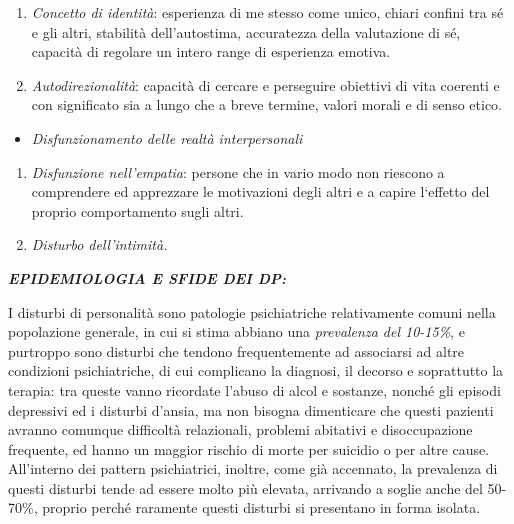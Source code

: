 \documentclass[]{article}
\begin{document}
\begin{enumerate}
\def\labelenumi{\arabic{enumi}.}
\item
  \emph{Concetto di identità}: esperienza di me stesso come unico,
  chiari confini tra sé e gli altri, stabilità dell'autostima,
  accuratezza della valutazione di sé, capacità di regolare un intero
  range di esperienza emotiva.
\item
  \emph{Autodirezionalità}: capacità di cercare e perseguire obiettivi
  di vita coerenti e con significato sia a lungo che a breve termine,
  valori morali e di senso etico.
\end{enumerate}

\begin{itemize}
\item
  \emph{Disfunzionamento delle realtà interpersonali}
\end{itemize}

\begin{enumerate}
\def\labelenumi{\arabic{enumi}.}
\item
  \emph{Disfunzione nell'empatia}: persone che in vario modo non
  riescono a comprendere ed apprezzare le motivazioni degli altri e a
  capire l`effetto del proprio comportamento sugli altri.
\item
  \emph{Disturbo dell'intimità.}
\end{enumerate}

\textbf{\emph{EPIDEMIOLOGIA E SFIDE DEI DP:}}

I disturbi di personalità sono patologie psichiatriche relativamente
comuni nella popolazione generale, in cui si stima abbiano una
\emph{prevalenza del 10-15\%}, e purtroppo sono disturbi che tendono
frequentemente ad associarsi ad altre condizioni psichiatriche, di cui
complicano la diagnosi, il decorso e soprattutto la terapia: tra queste
vanno ricordate l'abuso di alcol e sostanze, nonché gli episodi
depressivi ed i disturbi d'ansia, ma non bisogna dimenticare che questi
pazienti avranno comunque difficoltà relazionali, problemi abitativi e
disoccupazione frequente, ed hanno un maggior rischio di morte per
suicidio o per altre cause. All'interno dei pattern psichiatrici,
inoltre, come già accennato, la prevalenza di questi disturbi tende ad
essere molto più elevata, arrivando a soglie anche del 50-70\%, proprio
perché raramente questi disturbi si presentano in forma isolata.
\end{document}
